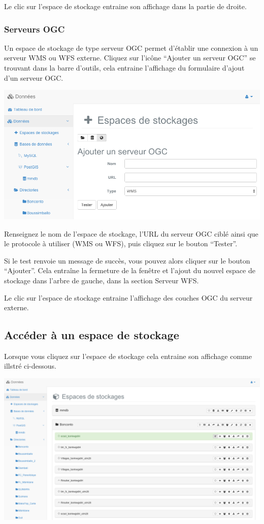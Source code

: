 \documentclass[letterpaper,10pt,french]{sphinxmanual}
\begin{document}
Le clic sur l'espace de stockage entraine son affichage dans la
partie de droite.


\subsubsection{Serveurs OGC}
\label{data/datastores:serveurs-ogc}
Un espace de stockage de type serveur OGC permet d'établir une
connexion à un serveur WMS ou WFS externe. Cliquez sur l'icône
``Ajouter un serveur OGC'' se trouvant dans la barre d'outils, cela
entraine l'affichage du formulaire d'ajout d'un serveur OGC.

\includegraphics[width=1.000\linewidth]{add-ogcserver-window.png}

Renseignez le nom de l'espace de stockage, l'URL du serveur OGC ciblé
ainsi que le protocole à utiliser (WMS ou WFS), puis cliquez sur le
bouton ``Tester''.

Si le test renvoie un message de succès, vous pouvez alors cliquer sur le bouton ``Ajouter''. Cela entraîne la fermeture de la fenêtre et l'ajout du nouvel espace de stockage dans l'arbre de gauche, dans la section Serveur WFS.

Le clic sur l'espace de stockage entraine l'affichage des couches OGC du serveur externe.


\subsection{Accéder à un espace de stockage}
\label{data/datastores:acceder-a-un-espace-de-stockage}
Lorsque vous cliquez sur l'espace de stockage cela entraine son
affichage comme illstré ci-dessous.

\includegraphics[width=1.000\linewidth]{data-store-preview.png}
\end{document}
